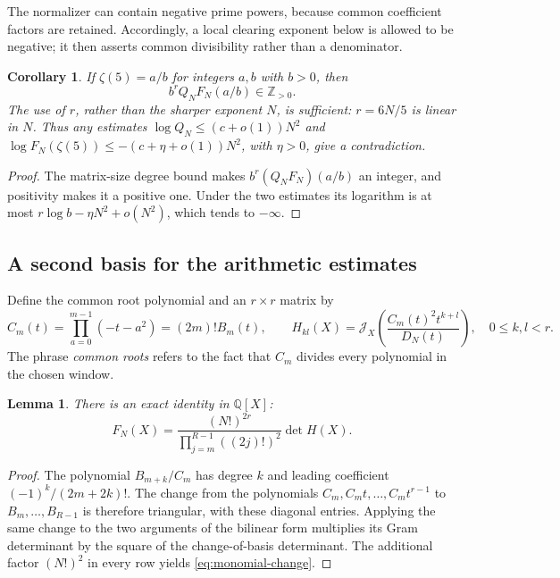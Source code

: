 \documentclass[11pt,letterpaper]{article}
\newtheorem{lemma}[lemma]{Lemma}
\newtheorem{corollary}[corollary]{Corollary}
\theoremstyle{definition}
\newcommand{\Q}{\mathbb Q}
\newcommand{\Z}{\mathbb Z}
\newcommand{\J}{\mathcal J}
\begin{document}
The normalizer can contain negative prime powers, because common
coefficient factors are retained. Accordingly, a local clearing exponent
below is allowed to be negative; it then asserts common divisibility
rather than a denominator.

\begin{corollary}\label{cor:closing-criterion}
If $\zeta(5)=a/b$ for integers $a,b$ with $b>0$, then
\begin{equation}\label{eq:positive-integer}
 b^rQ_NF_N(a/b)\in\Z_{>0}.
\end{equation}
The use of $r$, rather than the sharper exponent $N$, is sufficient:
$r=6N/5$ is linear in $N$. Thus any estimates
$\log Q_N\le (c+o(1))N^2$ and
$\log F_N(\zeta(5))\le-(c+\eta+o(1))N^2$, with $\eta>0$,
give a contradiction.
\end{corollary}
\begin{proof}
The matrix-size degree bound makes $b^r(Q_NF_N)(a/b)$ an integer,
and positivity makes it a positive one. Under the two estimates its
logarithm is at most $r\log b-\eta N^2+o(N^2)$, which tends
to $-\infty$.
\end{proof}

\subsection{A second basis for the arithmetic estimates}
Define the common root polynomial and an $r\times r$ matrix by
\[
 C_m(t)=\prod_{a=0}^{m-1}(-t-a^2)=(2m)!B_m(t),\qquad
 H_{kl}(X)=\J_X\left(\frac{C_m(t)^2t^{k+l}}{D_N(t)}\right),
 \quad 0\le k,l<r.
\]
The phrase \emph{common roots} refers to the fact that $C_m$ divides
every polynomial in the chosen window.

\begin{lemma}\label{lem:basis-change}
There is an exact identity in $\Q[X]$:
\begin{equation}\label{eq:monomial-change}
 F_N(X)=\frac{(N!)^{2r}}{\prod_{j=m}^{R-1}((2j)!)^2}\det H(X).
\end{equation}
\end{lemma}
\begin{proof}
The polynomial $B_{m+k}/C_m$ has degree $k$ and leading coefficient
$(-1)^k/(2m+2k)!$. The change from the polynomials
$C_m,C_mt,\ldots,C_mt^{r-1}$ to $B_m,\ldots,B_{R-1}$ is therefore
triangular, with these diagonal entries. Applying the same change to
the two arguments of the bilinear form multiplies its Gram determinant
by the square of the change-of-basis determinant. The additional
factor $(N!)^2$ in every row yields \eqref{eq:monomial-change}.
\end{proof}
\end{document}
